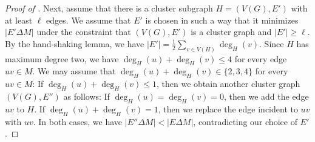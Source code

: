 \begin{proof}[Proof of ]
  Next, assume that there is a cluster subgraph $H = (V(G), E')$ with at least $\ell$ edges.
  We assume that $E'$ is chosen in such a way that it minimizes $|E' \Delta M|$ under the constraint that $(V(G), E')$ is a cluster graph and $|E'| \ge \ell$.
  By the hand-shaking lemma, we have $|E'| = \frac{1}{2}\sum_{v \in V(H)} \deg_H(v)$.
  Since $H$ has maximum degree two, we have $\deg_H(u) + \deg_H(v) \le 4$ for every edge $uv \in M$.
  We may assume that $\deg_H(u) + \deg_H(v) \in \{ 2, 3, 4 \}$ for every $uv \in M$:
  If $\deg_H(u) + \deg_H(v) \le 1$, then we obtain another cluster graph $(V(G), E'')$ as follows:
  If $\deg_H(u) = \deg_H(v) = 0$, then we add the edge $uv$ to $H$.
  If $\deg_H(u) + \deg_H(v) = 1$, then we replace the edge incident to $uv$ with $uv$.
  In both cases, we have $|E'' \Delta M| < |E \Delta M|$, contradicting our choice of $E'$.


\end{proof}
